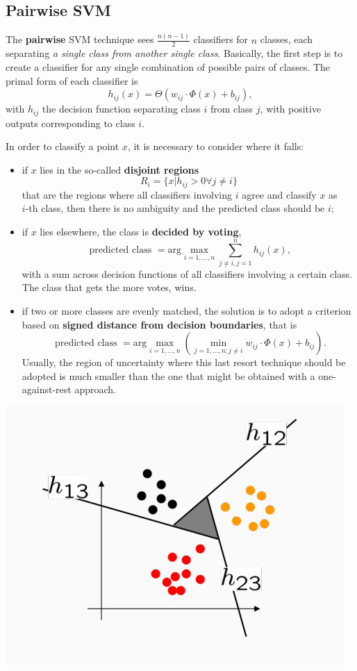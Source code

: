 \documentclass[10pt]{report}
\begin{document}
\subsection{Pairwise SVM}
\label{sec:orgabf7bc6}
The \textbf{pairwise} SVM technique sees \(\frac{n(n-1)}{2}\)
classifiers for \(n\) classes, each separating \emph{a single class from another single
class}. Basically, the first step is to create a classifier for any single
combination of possible pairs of classes. The primal form of each classifier is
$$h_{ij}(x) = \Theta(w_{ij}\cdot \Phi(x) + b_{ij}),$$ with \(h_{ij}\) the decision
function separating class \(i\) from class \(j\), with positive outputs
corresponding to class \(i\).

In order to classify a point \(x\), it is necessary to consider where it falls:
\begin{itemize}
\item if \(x\) lies in the so\--called \textbf{disjoint regions} $$R_i = \{x|h_{ij} > 0 \forall j \neq i\}$$ that are the regions where all classifiers involving \(i\) agree and classify \(x\) as \(i\mbox{-th}\) class, then there is no ambiguity and the predicted class should be \(i\);
\item if \(x\) lies elsewhere, the class is \textbf{decided by voting},
$$\mbox{ predicted class } = \mbox{arg}\max_{i=1,\dots,n} \sum_{j \neq i, j =
  1}^n h_{ij}(x),$$ with a sum across decision functions of all classifiers
involving a certain class. The class that gets the more votes, wins.
\item if two or more classes are evenly matched, the solution is to adopt a criterion based on \textbf{signed distance from decision boundaries}, that is
$$\mbox{ predicted class } = \mbox{arg}\max_{i=1,\dots,n}
  \left(\min_{j=1,\dots,n; j\neq i} w_{ij}\cdot \Phi(x) + b_{ij}\right).$$
Usually, the region of uncertainty where this last resort technique should be
adopted is much smaller than the one that might be obtained with a
one\--against\--rest approach.
\end{itemize}

\begin{center}
\includegraphics[width=.9\linewidth]{./pics/svm/svm-pair-1.jpg}
\end{center}
\end{document}
